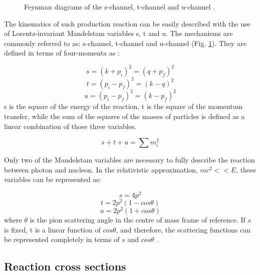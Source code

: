 \begin{figure}[H]
\begin{center}
\caption{Feynman diagrams of the s-channel, t-channel and u-channel \cite{jo}.}
\label{mandelstam}
\end{center}
\end{figure}

\indent The kinematics of such production reaction can be easily described with the use of Lorentz-invariant Mandelstam variables s, t and u. The mechanisms are commonly referred to as: s-channel, t-channel and u-channel (Fig. \ref{mandelstam}). They are defined in terms of four-momenta as \cite{walker}:

\begin{equation}
s=(k+p_{i})^{2}=(q+p_{f})^{2}
\end{equation}
\begin{equation}
t=(p_{i}-p_{f})^{2}=(k-q)^{2}
\end{equation}
\begin{equation}
u=(p_{i}-p_{f})^{2}=(k-p_{f})^{2}
\end{equation}
s is the square of the energy of the reaction, t is the square of the momentum transfer, while the sum of the squares of the masses of particles is defined as a linear combination of those three variables.

\begin{equation}
s+t+u=\sum m^{2}_{i}
\end{equation}

\indent Only two of the Mandelstam variables are necessary to fully describe the reaction between photon and nucleon. In the relativistic approximation, $mc^{2}<<E$, these variables can be represented as:

\begin{equation}
s=4p^{2}
\end{equation}
\begin{equation}
t=2p^{2}(1-cos\theta)
\end{equation}
\begin{equation}
u=2p^{2}(1+cos\theta)
\end{equation}
where $\theta$ is the pion scattering angle in the centre of mass frame of reference. If $s$ is fixed, t is a linear function of $cos\theta$, and therefore, the scattering functions can be represented completely in terms of $s$ and $cos\theta$ \cite{bertulani}.

\subsection{Reaction cross sections}

